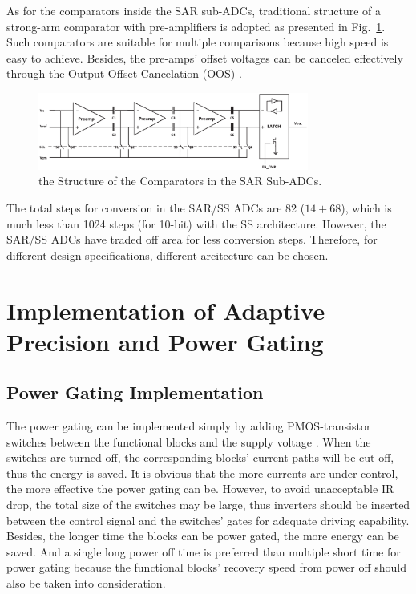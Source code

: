 \documentclass[conference]{IEEEtran}
\begin{document}
As for the comparators inside the SAR sub-ADCs, traditional structure of a strong-arm comparator with pre-amplifiers is adopted as presented in Fig.~\ref{LATCH}. Such comparators 
are suitable for multiple comparisons because high speed is easy to achieve. Besides, the pre-amps’ offset voltages can be canceled effectively through the Output Offset Cancelation (OOS) \cite{razavi_design_1992}.

\begin{figure}[htbp]
	\centerline{\includegraphics[width=3.5in]{./Figures/LATCH.eps}}
	\caption{the Structure of the Comparators in the SAR Sub-ADCs.}
	\label{LATCH}
\end{figure} 

 The total steps for conversion in the SAR/SS ADCs are 82 ($14+68$), which is much less than 1024 steps (for 10-bit) with the SS architecture. 
 However, the SAR/SS ADCs have traded off area for less conversion steps. Therefore, for different design specifications, different arcitecture can be chosen.

\section{Implementation of Adaptive Precision and Power Gating}\label{strategy}

\subsection{Power Gating Implementation}

The power gating can be implemented simply by adding PMOS-transistor switches between the functional blocks and the supply voltage \cite{keating_low_2007}. 
When the switches are turned off, the corresponding blocks’ current paths will be cut off, thus the energy is saved. 
It is obvious that the more currents are under control, the more effective the power gating can be. However, to avoid unacceptable IR drop, the total size of the switches may be large, 
thus inverters should be inserted between the control signal and the switches’ gates for adequate driving capability. 
Besides, the longer time the blocks can be power gated, the more energy can be saved. And a single long power off time is preferred than multiple short time for power gating because
the functional blocks’ recovery speed from power off should also be taken into consideration.
\end{document}
